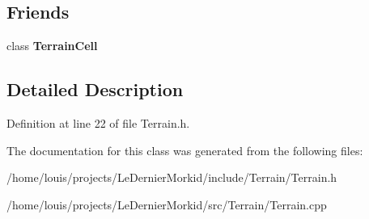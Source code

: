 \subsection*{Friends}
\begin{DoxyCompactItemize}
\item 
\mbox{\label{class_terrain_a403e723a938a88a4e53eb87b478db7c0}} 
class {\bfseries Terrain\+Cell}
\end{DoxyCompactItemize}


\subsection{Detailed Description}


Definition at line 22 of file Terrain.\+h.



The documentation for this class was generated from the following files\+:\begin{DoxyCompactItemize}
\item 
/home/louis/projects/\+Le\+Dernier\+Morkid/include/\+Terrain/Terrain.\+h\item 
/home/louis/projects/\+Le\+Dernier\+Morkid/src/\+Terrain/Terrain.\+cpp\end{DoxyCompactItemize}
